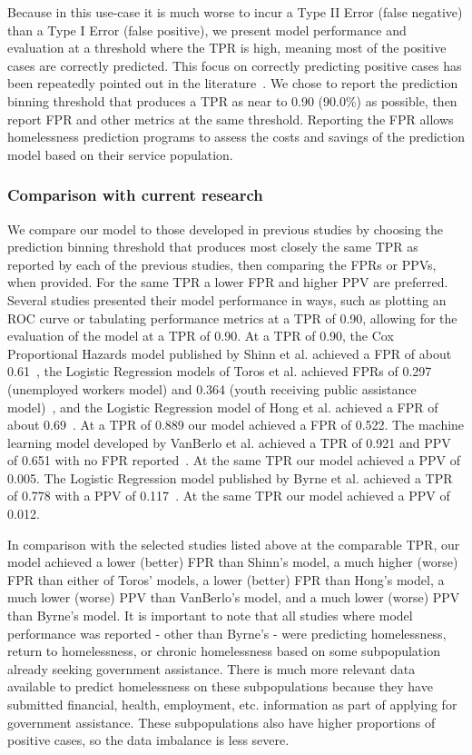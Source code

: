 \documentclass[10pt,letterpaper]{article}
\begin{document}
Because in this use-case it is much worse to incur a Type II Error (false negative) than a Type I Error (false positive), we present model performance and evaluation at a threshold where the TPR is high, meaning most of the positive cases are correctly predicted. This focus on correctly predicting positive cases has been repeatedly pointed out in the literature~\cite{vanberlo2021interpretable,hong2018applications}. We chose to report the prediction binning threshold that produces a TPR as near to 0.90 (90.0\%) as possible, then report FPR and other metrics at the same threshold. Reporting the FPR allows homelessness prediction programs to assess the costs and savings of the prediction model based on their service population.

\subsubsection*{Comparison with current research}
We compare our model to those developed in previous studies by choosing the prediction binning threshold that produces most closely the same TPR as reported by each of the previous studies, then comparing the FPRs or PPVs, when provided. For the same TPR a lower FPR and higher PPV are preferred. Several studies presented their model performance in ways, such as plotting an ROC curve or tabulating performance metrics at a TPR of 0.90, allowing for the evaluation of the model at a TPR of 0.90. At a TPR of 0.90, the Cox Proportional Hazards model published by Shinn et al. achieved a FPR of about 0.61~\cite{shinn2013efficient}, the Logistic Regression models of Toros et al. achieved FPRs of 0.297 (unemployed workers model) and 0.364 (youth receiving public assistance model)~\cite{toros2019early}, and the Logistic Regression model of Hong et al. achieved a FPR of about 0.69~\cite{hong2018applications}. At a TPR of 0.889 our model achieved a FPR of 0.522. The machine learning model developed by VanBerlo et al. achieved a TPR of 0.921 and PPV of 0.651 with no FPR reported~\cite{vanberlo2021interpretable}. At the same TPR our model achieved a PPV of 0.005. The Logistic Regression model published by Byrne et al. achieved a TPR of 0.778 with a PPV of 0.117~\cite{byrne2020classification}. At the same TPR our model achieved a PPV of 0.012.

In comparison with the selected studies listed above at the comparable TPR, our model achieved a lower (better) FPR than Shinn's model, a much higher (worse) FPR than either of Toros' models, a lower (better) FPR than Hong's model, a much lower (worse) PPV than VanBerlo's model, and a much lower (worse) PPV than Byrne's model. It is important to note that all studies where model performance was reported - other than Byrne's - were predicting homelessness, return to homelessness, or chronic homelessness based on some subpopulation already seeking government assistance. There is much more relevant data available to predict homelessness on these subpopulations because they have submitted financial, health, employment, etc. information as part of applying for government assistance. These subpopulations also have higher proportions of positive cases, so the data imbalance is less severe.
\end{document}
